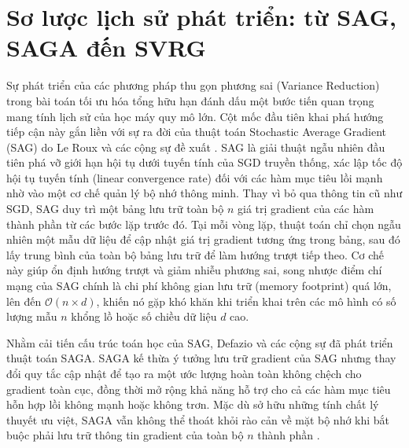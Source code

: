 \section{Sơ lược lịch sử phát triển: từ SAG, SAGA đến SVRG}

Sự phát triển của các phương pháp thu gọn phương sai (Variance Reduction) trong bài toán tối ưu hóa tổng hữu hạn đánh dấu một bước tiến quan trọng mang tính lịch sử của học máy quy mô lớn. Cột mốc đầu tiên khai phá hướng tiếp cận này gắn liền với sự ra đời của thuật toán Stochastic Average Gradient (SAG) do Le Roux và các cộng sự đề xuất \cite{leroux2012stochastic, schmidt2017minimizing}. SAG là giải thuật ngẫu nhiên đầu tiên phá vỡ giới hạn hội tụ dưới tuyến tính của SGD truyền thống, xác lập tốc độ hội tụ tuyến tính (linear convergence rate) đối với các hàm mục tiêu lồi mạnh nhờ vào một cơ chế quản lý bộ nhớ thông minh. Thay vì bỏ qua thông tin cũ như SGD, SAG duy trì một bảng lưu trữ toàn bộ $n$ giá trị gradient của các hàm thành phần từ các bước lặp trước đó. Tại mỗi vòng lặp, thuật toán chỉ chọn ngẫu nhiên một mẫu dữ liệu để cập nhật giá trị gradient tương ứng trong bảng, sau đó lấy trung bình của toàn bộ bảng lưu trữ để làm hướng trượt tiếp theo. Cơ chế này giúp ổn định hướng trượt và giảm nhiễu phương sai, song nhược điểm chí mạng của SAG chính là chi phí không gian lưu trữ (memory footprint) quá lớn, lên đến $\mathcal{O}(n \times d)$, khiến nó gặp khó khăn khi triển khai trên các mô hình có số lượng mẫu $n$ khổng lồ hoặc số chiều dữ liệu $d$ cao.

Nhằm cải tiến cấu trúc toán học của SAG, Defazio và các cộng sự \cite{defazio2014saga} đã phát triển thuật toán SAGA. SAGA kế thừa ý tưởng lưu trữ gradient của SAG nhưng thay đổi quy tắc cập nhật để tạo ra một ước lượng hoàn toàn không chệch cho gradient toàn cục, đồng thời mở rộng khả năng hỗ trợ cho cả các hàm mục tiêu hỗn hợp lồi không mạnh hoặc không trơn. Mặc dù sở hữu những tính chất lý thuyết ưu việt, SAGA vẫn không thể thoát khỏi rào cản về mặt bộ nhớ khi bắt buộc phải lưu trữ thông tin gradient của toàn bộ $n$ thành phần \cite{driggs2022accelerating}. 

